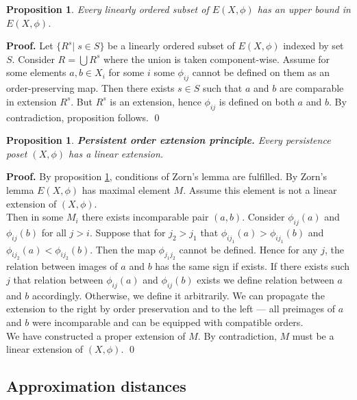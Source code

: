 \documentclass[english,12pt]{article}
\newcounter{stmcounter}[section]
\numberwithin{equation}{section}
\newtheorem{proposition}[stmcounter]{Proposition}
\theoremstyle{definition}
\theoremstyle{remark}
\newenvironment{pf}{\noindent\textbf{Proof.}}{\qed}
\begin{document}
\begin{proposition}
  \label{Zorn_cond}
  Every linearly ordered subset of $E(X,\phi)$ has an upper bound in $E(X,\phi)$.
\end{proposition}

\begin{pf}
  Let $\{R^s|\;s \in S\}$ be a linearly ordered subset of $E(X,\phi)$ indexed by set $S$. Consider $R = \bigcup R^s$ where the union is taken component-wise. Assume for some elements $a, b \in X_i$ for some $i$ some $\phi_{ij}$ cannot be defined on them as an order-preserving map. Then there exists $s \in S$ such that $a$ and $b$ are comparable in extension $R^s$. But $R^s$ is an extension, hence $\phi_{ij}$ is defined on both $a$ and $b$. By contradiction, proposition follows.
\end{pf}

\begin{proposition}
  \textbf{Persistent order extension principle.} Every persistence poset $(X,\phi)$ has a linear extension.
\end{proposition}

\begin{pf}
  By proposition \ref{Zorn_cond}, conditions of Zorn's lemma are fulfilled. By Zorn's lemma $E(X,\phi)$ has maximal element $M$. Assume this element is not a linear extension of $(X,\phi)$.\\

  Then in some $M_i$ there exists incomparable pair $(a,b)$. Consider $\phi_{ij}(a)$ and $\phi_{ij}(b)$ for all $j > i$. Suppose that for $j_2 > j_1$ that $\phi_{ij_1}(a) > \phi_{ij_1}(b)$ and $\phi_{ij_2}(a) < \phi_{ij_2}(b)$. Then the map $\phi_{j_1j_2}$ cannot be defined. Hence for any $j$, the relation between images of $a$ and $b$ has the same sign if exists. If there exists such $j$ that relation between $\phi_{ij}(a)$ and $\phi_{ij}(b)$ exists we define relation between $a$ and $b$ accordingly. Otherwise, we define it arbitrarily. We can propagate the extension to the right by order preservation and to the left --- all preimages of $a$ and $b$ were incomparable and can be equipped with compatible orders.\\

  We have constructed a proper extension of $M$. By contradiction, $M$ must be a linear extension of $(X,\phi)$.
\end{pf}

\subsection{Approximation distances}
\end{document}
